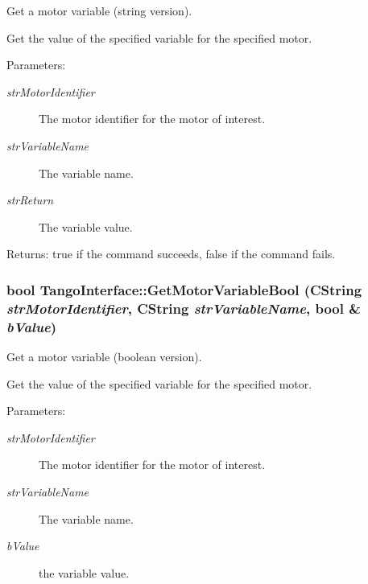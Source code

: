 Get a motor variable (string version). 

Get the value of the specified variable for the specified motor.

\begin{Desc}
\item[Parameters:]
\begin{description}
\item[{\em strMotorIdentifier}]The motor identifier for the motor of interest.\item[{\em strVariableName}]The variable name. \item[{\em strReturn}]The variable value. \end{description}
\end{Desc}


\begin{Desc}
\item[Returns:]true if the command succeeds, false if the command fails. \end{Desc}
\hypertarget{classTangoInterface_8b0eb830867b7d62dc4350b49b430705}{
\subsubsection[GetMotorVariableBool]{\setlength{\rightskip}{0pt plus 5cm}bool TangoInterface::GetMotorVariableBool (CString {\em strMotorIdentifier}, \/  CString {\em strVariableName}, \/  bool \& {\em bValue})}}
\label{classTangoInterface_8b0eb830867b7d62dc4350b49b430705}


Get a motor variable (boolean version). 

Get the value of the specified variable for the specified motor.

\begin{Desc}
\item[Parameters:]
\begin{description}
\item[{\em strMotorIdentifier}]The motor identifier for the motor of interest.\item[{\em strVariableName}]The variable name. \item[{\em bValue}]the variable value. \end{description}
\end{Desc}


